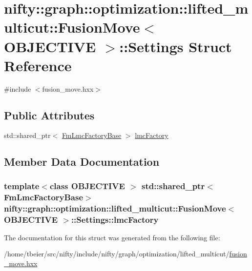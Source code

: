 \hypertarget{structnifty_1_1graph_1_1optimization_1_1lifted__multicut_1_1FusionMove_1_1Settings}{}\section{nifty\+:\+:graph\+:\+:optimization\+:\+:lifted\+\_\+multicut\+:\+:Fusion\+Move$<$ O\+B\+J\+E\+C\+T\+I\+V\+E $>$\+:\+:Settings Struct Reference}
\label{structnifty_1_1graph_1_1optimization_1_1lifted__multicut_1_1FusionMove_1_1Settings}


{\ttfamily \#include $<$fusion\+\_\+move.\+hxx$>$}

\subsection*{Public Attributes}
\begin{DoxyCompactItemize}
\item 
std\+::shared\+\_\+ptr$<$ \hyperlink{classnifty_1_1graph_1_1optimization_1_1lifted__multicut_1_1FusionMove_a8429284d91db12e469fab5ba357cfced}{Fm\+Lmc\+Factory\+Base} $>$ \hyperlink{structnifty_1_1graph_1_1optimization_1_1lifted__multicut_1_1FusionMove_1_1Settings_a0310552b9cd037831172b54aa8674dd7}{lmc\+Factory}
\end{DoxyCompactItemize}


\subsection{Member Data Documentation}
\hypertarget{structnifty_1_1graph_1_1optimization_1_1lifted__multicut_1_1FusionMove_1_1Settings_a0310552b9cd037831172b54aa8674dd7}{}
\subsubsection[{lmc\+Factory}]{\setlength{\rightskip}{0pt plus 5cm}template$<$class O\+B\+J\+E\+C\+T\+I\+V\+E $>$ std\+::shared\+\_\+ptr$<${\bf Fm\+Lmc\+Factory\+Base}$>$ {\bf nifty\+::graph\+::optimization\+::lifted\+\_\+multicut\+::\+Fusion\+Move}$<$ O\+B\+J\+E\+C\+T\+I\+V\+E $>$\+::Settings\+::lmc\+Factory}\label{structnifty_1_1graph_1_1optimization_1_1lifted__multicut_1_1FusionMove_1_1Settings_a0310552b9cd037831172b54aa8674dd7}


The documentation for this struct was generated from the following file\+:\begin{DoxyCompactItemize}
\item 
/home/tbeier/src/nifty/include/nifty/graph/optimization/lifted\+\_\+multicut/\hyperlink{lifted__multicut_2fusion__move_8hxx}{fusion\+\_\+move.\+hxx}\end{DoxyCompactItemize}

